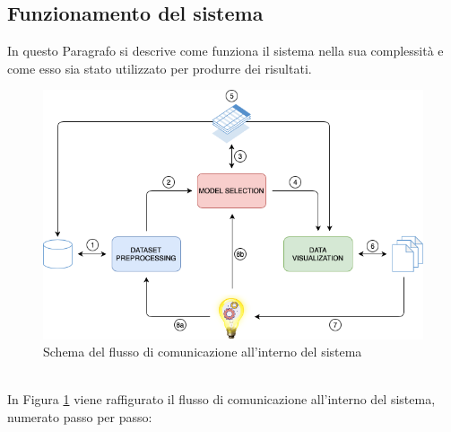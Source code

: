 \documentclass[12pt]{report}
\theoremstyle{definition}
\begin{document}
\subsection{Funzionamento del sistema}
In questo Paragrafo si descrive come funziona il sistema nella sua complessità e come esso sia stato utilizzato per produrre dei risultati.
\begin{figure}[!ht]
    \centering
    \includegraphics[scale=0.6]{images/cycle.png}
    \caption{Schema del flusso di comunicazione all'interno del sistema}
    \label{cycle}
\end{figure}
\\
In Figura \ref{cycle} viene raffigurato il flusso di comunicazione all'interno del sistema, numerato passo per passo: 
\end{document}
